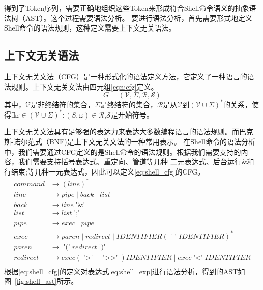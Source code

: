\documentclass[a4paper,twoside]{article}
\begin{document}
\begin{spacing}{1.2}
得到了Token序列，需要正确地组织这些Token来形成符合Shell命令语义的抽象语法树（AST）。这个过程需要语法分析\cite{aho2007compilers}。
要进行语法分析，首先需要形式地定义Shell命令的语法规则，这种定义需要上下文无关语法。

\subsection{上下文无关语法}

上下文无关文法（CFG）是一种形式化的语法定义方法，它定义了一种语言的语法规则。上下文无关文法由四元组\eqref{eqn:cfg}定义。
\begin{equation}
	\label{eqn:cfg}
	G=(\mathcal{V},\Sigma,\mathcal{R},\mathcal{S})
\end{equation}
其中，$\mathcal{V}$是非终结符的集合，$\Sigma$是终结符的集合，$\mathcal{R}$是从$\mathcal{V}$到$(\mathcal{V} \cup \Sigma)^*$的关系，使得$\exists \omega \in (\mathcal{V}\cup \Sigma)^*: (S,\omega)\in \mathcal{R}$,$\mathcal{S}$是开始符号。

上下文无关文法具有足够强的表达力来表达大多数编程语言的语法规则。而巴克斯-诺尔范式（BNF)是上下文无关文法的一种常用表示。
在Shell命令的语法分析中，我们需要通过CFG定义的是Shell命令的语法规则。根据我们需要支持的内容，我们需要支持括号表达式、重定向、管道等几种
二元表达式、后台运行$\&$和行结束;等几种一元表达式，因此可以定义\eqref{eq:shell_cfg}的CFG。
\begin{equation}
	\label{eq:shell_cfg}
	\begin{aligned}
		command &\rightarrow (line)^* \\
		line &\rightarrow pipe \operatorname{|} back  \operatorname{|} list \\
		back &\rightarrow line \operatorname{'\&'} \\
		list &\rightarrow list \operatorname{';'} \\
		pipe &\rightarrow exec \operatorname{|} pipe \\ 
		exec &\rightarrow paren \operatorname{|} redirect \operatorname{|} IDENTIFIER (\operatorname{'-'}IDENTIFIER)^*\\
		paren &\rightarrow \operatorname{'('} redirect \operatorname{')'} \\
		redirect &\rightarrow exec (\operatorname{'>'}\operatorname{|}\operatorname{'>>'}) IDENTIFIER \operatorname{|} exec \operatorname{'<'} IDENTIFIER \\
	\end{aligned}	
\end{equation}
根据\eqref{eq:shell_cfg}的定义对表达式\eqref{eq:shell_exp}进行语法分析，得到的AST如图~\ref{fig:shell_ast}所示。


\end{spacing}
\end{document}

